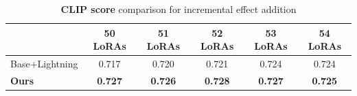 
\begin{table}[!t]
\centering
\caption{\textbf{CLIP score} comparison for incremental effect addition}
\vspace{-0.3cm}
\label{tab:lora_50_to_54}
\begin{tabular}{lccccc}
\toprule
 & 50 LoRAs & 51 LoRAs & 52 LoRAs & 53 LoRAs & 54 LoRAs \\ 
\midrule
Base+Lightning & 0.717 & 0.720 & 0.721 & 0.724 & 0.724 \\ 
\textbf{Ours} & \textbf{0.727} & \textbf{0.726} & \textbf{0.728} & \textbf{0.727} & \textbf{0.725} \\ 
\bottomrule
\end{tabular}%
\vspace{-0.4cm}
\end{table}